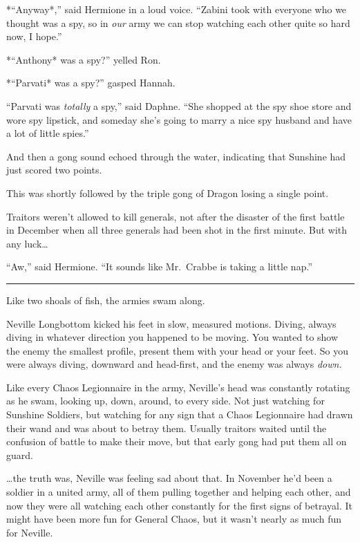 *``Anyway*,'' said Hermione in a loud voice. ``Zabini took with everyone
who we thought was a spy, so in \emph{our} army we can stop watching
each other quite so hard now, I hope.''

*``Anthony* was a spy?'' yelled Ron.

*``Parvati* was a spy?'' gasped Hannah.

``Parvati was \emph{totally} a spy,'' said Daphne. ``She shopped at the
spy shoe store and wore spy lipstick, and someday she's going to marry a
nice spy husband and have a lot of little spies.''

And then a gong sound echoed through the water, indicating that Sunshine
had just scored two points.

This was shortly followed by the triple gong of Dragon losing a single
point.

Traitors weren't allowed to kill generals, not after the disaster of the
first battle in December when all three generals had been shot in the
first minute. But with any luck\ldots{}

``Aw,'' said Hermione. ``It sounds like Mr.~Crabbe is taking a little
nap.''

\begin{center}\rule{3in}{0.4pt}\end{center}

Like two shoals of fish, the armies swam along.

Neville Longbottom kicked his feet in slow, measured motions. Diving,
always diving in whatever direction you happened to be moving. You
wanted to show the enemy the smallest profile, present them with your
head or your feet. So you were always diving, downward and head-first,
and the enemy was always \emph{down.}

Like every Chaos Legionnaire in the army, Neville's head was constantly
rotating as he swam, looking up, down, around, to every side. Not just
watching for Sunshine Soldiers, but watching for any sign that a Chaos
Legionnaire had drawn their wand and was about to betray them. Usually
traitors waited until the confusion of battle to make their move, but
that early gong had put them all on guard.

\ldots{}the truth was, Neville was feeling sad about that. In November
he'd been a soldier in a united army, all of them pulling together and
helping each other, and now they were all watching each other constantly
for the first signs of betrayal. It might have been more fun for General
Chaos, but it wasn't nearly as much fun for Neville.

